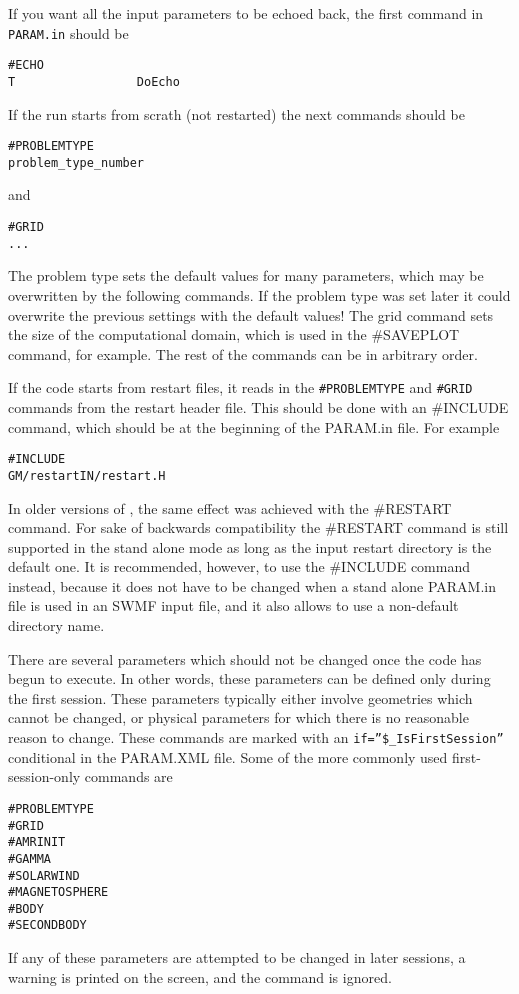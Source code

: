 If you want all the input parameters to be echoed back, the first
command in {\tt PARAM.in} should be
\begin{verbatim}
#ECHO
T                 DoEcho
\end{verbatim}
If the run starts from scrath (not restarted) the next commands should be
\begin{verbatim}
#PROBLEMTYPE
problem_type_number
\end{verbatim}
and 
\begin{verbatim}
#GRID
...
\end{verbatim}
The problem type sets the default values for many parameters,
which may be overwritten by the following commands. If the 
problem type was set later it could overwrite the previous
settings with the default values!
The grid command sets the size of the computational domain,
which is used in the \#SAVEPLOT command, for example.
The rest of the commands can be in arbitrary order.

If the code starts from restart files, it reads in the
{\tt \#PROBLEMTYPE} and {\tt \#GRID} commands from the 
restart header file.
This should be done with an \#INCLUDE command, which
should be at the beginning of the PARAM.in file. For example
\begin{verbatim}
#INCLUDE
GM/restartIN/restart.H
\end{verbatim}
In older versions of \BATSRUS, the same effect was achieved 
with the \#RESTART command. For sake of backwards compatibility
the \#RESTART command is still supported in
the stand alone mode as long as the input restart directory
is the default one. It is recommended, however, to use
the \#INCLUDE command instead, because it does not have
to be changed when a stand alone PARAM.in file is used
in an SWMF input file, and it also allows to use a non-default
directory name.

There are several parameters which should not be changed once the code 
has begun to execute.  
In other words, these parameters can be defined only during the first
session.  These parameters typically either involve geometries which 
cannot be changed, or physical parameters for which there is no reasonable 
reason to change. These commands are marked with an 
{\tt if=''\$\_IsFirstSession''} conditional in the PARAM.XML file.
Some of the more commonly used first-session-only commands are
\begin{verbatim}
#PROBLEMTYPE 
#GRID 
#AMRINIT
#GAMMA
#SOLARWIND
#MAGNETOSPHERE
#BODY
#SECONDBODY
\end{verbatim}
If any of these parameters are attempted to be changed in later sessions, 
a warning is printed on the screen, and the command is ignored.

